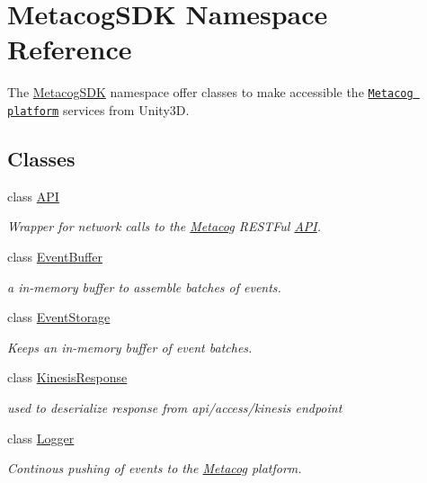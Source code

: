 \hypertarget{namespaceMetacogSDK}{}\section{Metacog\+S\+DK Namespace Reference}
\label{namespaceMetacogSDK}


The \hyperlink{namespaceMetacogSDK}{Metacog\+S\+DK} namespace offer classes to make accessible the \href{}{\tt Metacog platform} services from Unity3D.  


\subsection*{Classes}
\begin{DoxyCompactItemize}
\item 
class \hyperlink{classMetacogSDK_1_1API}{A\+PI}
\begin{DoxyCompactList}\small\item\em Wrapper for network calls to the \hyperlink{classMetacogSDK_1_1Metacog}{Metacog} R\+E\+S\+T\+Ful \hyperlink{classMetacogSDK_1_1API}{A\+PI}. \end{DoxyCompactList}\item 
class \hyperlink{classMetacogSDK_1_1EventBuffer}{Event\+Buffer}
\begin{DoxyCompactList}\small\item\em a in-\/memory buffer to assemble batches of events. \end{DoxyCompactList}\item 
class \hyperlink{classMetacogSDK_1_1EventStorage}{Event\+Storage}
\begin{DoxyCompactList}\small\item\em Keeps an in-\/memory buffer of event batches. \end{DoxyCompactList}\item 
class \hyperlink{classMetacogSDK_1_1KinesisResponse}{Kinesis\+Response}
\begin{DoxyCompactList}\small\item\em used to deserialize response from api/access/kinesis endpoint \end{DoxyCompactList}\item 
class \hyperlink{classMetacogSDK_1_1Logger}{Logger}
\begin{DoxyCompactList}\small\item\em Continous pushing of events to the \hyperlink{classMetacogSDK_1_1Metacog}{Metacog} platform. \end{DoxyCompactList}\item 

\end{DoxyCompactItemize}
